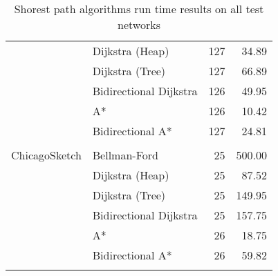 \begin{table}[H]
{\begin{tabular}{l l r r}
                      & Dijkstra (Heap)         & 127 & 34.89\\
                      & Dijkstra (Tree)         & 127 & 66.89\\
                      & Bidirectional Dijkstra  & 126 & 49.95\\
                      & A*                      & 126 & 10.42\\
                      & Bidirectional A*        & 127 & 24.81\\ \\
        ChicagoSketch & Bellman-Ford            & 25 & 500.00\\
                      & Dijkstra (Heap)         & 25 & 87.52\\
                      & Dijkstra (Tree)         & 25 & 149.95\\
                      & Bidirectional Dijkstra  & 25 & 157.75\\
                      & A*                      & 26 & 18.75\\
                      & Bidirectional A*        & 26 & 59.82\\ \\
        \bottomrule
     \end{tabular}
     \caption{Shorest path algorithms run time results on all test networks}
     \label{table:allresults}
}
\end{table}
